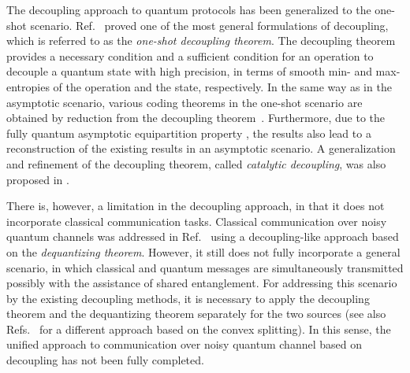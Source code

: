 \documentclass[journal]{IEEEtran}
\begin{document}
The decoupling approach to quantum protocols has been generalized to the one-shot scenario.
Ref.~\cite{DBWR2010} proved one of the most general formulations of decoupling, which is referred to as the {\it one-shot decoupling theorem}.
The decoupling theorem provides a necessary condition and a sufficient condition for an operation to decouple a quantum state with high precision, in terms of smooth min- and max- entropies of the operation and the state, respectively.
In the same way as in the asymptotic scenario, various coding theorems in the one-shot scenario are obtained by reduction from the decoupling theorem~\cite{fred10_2}.
Furthermore, due to the fully quantum asymptotic equipartition property \cite{tomamichel2009fully}, the results also lead to a reconstruction of the existing results in an asymptotic scenario.
A generalization and refinement of the decoupling theorem, called {\it catalytic decoupling}, was also proposed in \cite{majenz2017catalytic}.



There is, however, a limitation in the decoupling approach, in that it does not incorporate classical communication tasks. 
Classical communication over noisy quantum channels was addressed in Ref.~\cite{dupuis2014decoupling} using a decoupling-like approach based on the {\it dequantizing theorem}. However, it still does not fully incorporate a general scenario, in which classical and quantum messages are simultaneously transmitted possibly with the assistance of shared entanglement. For addressing this scenario by the existing decoupling methods, it is necessary to apply the decoupling theorem and the dequantizing theorem separately for the two sources (see also Refs.~\cite{salek2019one} for a different approach based on the convex splitting).
In this sense, the unified approach to communication over noisy quantum channel based on decoupling has not been fully completed.
\end{document}
